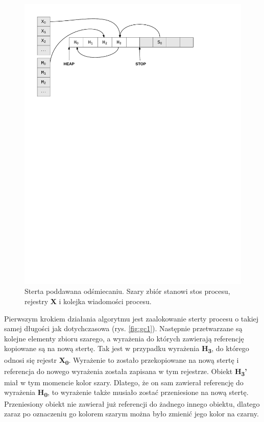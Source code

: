 \begin{figure}[h]
\centerline{\includegraphics[scale=0.75, clip, trim=10mm 185mm 45mm 10mm]{gc_0}}
\caption{Sterta poddawana odśmiecaniu. Szary zbiór stanowi stos procesu, rejestry \textbf{X} i kolejka wiadomości procesu.}
\label{fig:gc0}
\end{figure}

Pierwszym krokiem działania algorytmu jest zaalokowanie sterty procesu o takiej samej długości jak dotychczasowa (rys. \ref{fig:gc1}).
Następnie przetwarzane są kolejne elementy zbioru szarego, a wyrażenia do których zawierają referencję kopiowane są na nową stertę.
Tak jest w przypadku wyrażenia \textbf{H\textsubscript{3}}, do którego odnosi się rejestr \textbf{X\textsubscript{0}}.
Wyrażenie to zostało przekopiowane na nową stertę i referencja do nowego wyrażenia została zapisana w tym rejestrze.
Obiekt \textbf{H\textsubscript{3}'} miał w tym momencie kolor szary.
Dlatego, że on sam zawierał referencję do wyrażenia \textbf{H\textsubscript{0}}, to wyrażenie także musiało zostać przeniesione na nową stertę.
Przeniesiony obiekt nie zawierał już referencji do żadnego innego obiektu, dlatego zaraz po oznaczeniu go kolorem szarym można było zmienić jego kolor na czarny.

